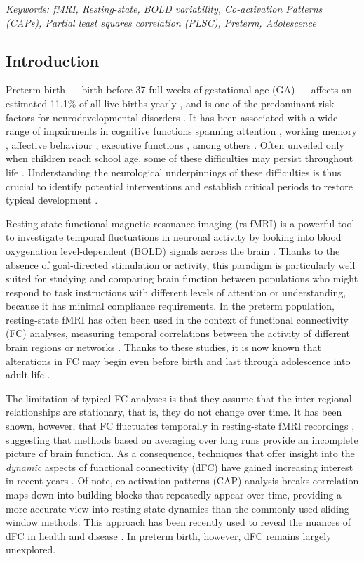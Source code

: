 \textit{Keywords: fMRI, Resting-state, BOLD variability, Co-activation Patterns (CAPs), Partial least squares correlation (PLSC), Preterm, Adolescence}

\subsection{Introduction}
 Preterm birth --- birth before 37 full weeks of gestational age (GA) --- affects an estimated 11.1\% of all live births yearly \citep{Blencowe2013}, and is one of the predominant risk factors for neurodevelopmental disorders \citep{Twilhaar2018}. 
    It has been associated with a wide range of impairments in cognitive functions spanning attention \citep{Rommel2017}, working memory \citep{Allotey2018}, affective behaviour \citep{Hornman2016}, executive functions \citep{Costa2017, Burnett2018}, among others \citep{Moreira2014, Allotey2018}. Often unveiled only when children reach school age, some of these difficulties may persist throughout life \citep{Anderson2014, Kajantie2019}. Understanding the neurological underpinnings of these difficulties is thus crucial to identify potential interventions and establish critical periods to restore typical development \citep{Wolke2019}.
    
     Resting-state functional magnetic resonance imaging (rs-fMRI) is a powerful tool to investigate temporal fluctuations in neuronal activity by looking into  blood oxygenation level-dependent (BOLD) signals across the brain \citep{Fox2007}. Thanks to the absence of goal-directed stimulation or activity, this paradigm is particularly well suited for studying and comparing brain function between populations who might respond to task instructions with different levels of attention or understanding, because it has minimal compliance requirements. In the preterm population, resting-state fMRI has often been used in the context of functional connectivity (FC) analyses, measuring temporal correlations between the activity of different brain regions or networks \citep{Lordier2019}. Thanks to these studies, it is now known that alterations in FC may begin even before birth \citep{Thomason2017} and last through adolescence \citep{Wehrle2018} into adult life \citep{Papini2016}. 

  The limitation of typical FC analyses is that they assume that the inter-regional relationships are stationary, that is, they do not change over time. It has been shown, however, that FC fluctuates temporally in resting-state fMRI recordings \citep{Chang2010}, suggesting that methods based on averaging over long runs provide an incomplete picture of brain function. As a consequence, techniques that offer insight into the \textit{dynamic} aspects of functional connectivity (dFC) have gained increasing interest in recent years \citep{Preti2016}. Of note, co-activation patterns (CAP) analysis \citep{Liu2018} breaks correlation maps down into building blocks that repeatedly appear over time, providing a more accurate view into resting-state dynamics than the commonly used sliding-window methods. This approach has been recently used to reveal the nuances of dFC in health and disease \citep{Kaiser2019}. In preterm birth, however, dFC remains largely unexplored.
  
